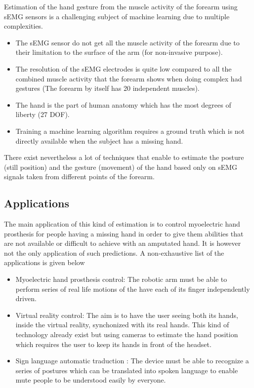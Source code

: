 \documentclass{article}
\begin{document}
Estimation of the hand gesture from the muscle activity of the forearm using sEMG sensors is a challenging subject of machine learning due to multiple complexities.
\begin{itemize}
    \item The sEMG sensor do not get all the muscle activity of the forearm due to their limitation to the surface of the arm (for non-invasive purpose).
    \item The resolution of the sEMG electrodes is quite low compared to all the combined muscle activity that the forearm shows when doing complex had gestures (The forearm by itself has 20 independent muscles).
    \item The hand is the part of human anatomy which has the most degrees of liberty (27 DOF).
    \item Training a machine learning algorithm requires a ground truth which is not directly available when the subject has a missing hand.
\end{itemize}

There exist nevertheless a lot of techniques that enable to estimate the posture (still position) and the gesture (movement) of the hand based only on sEMG signals taken from different points of the forearm.


\subsection{Applications}

The main application of this kind of estimation is to control myoelectric hand prosthesis for people having a missing hand in order to give them abilities that are not available or difficult to achieve with an amputated hand. It is however not the only application of such predictions. A non-exhaustive list of the applications is given below

\begin{itemize}
    \item Myoelectric hand prosthesis control:  The robotic arm must be able to perform series of real life motions of the have each of its finger independently driven.
    \item Virtual reality control:  The aim is to have the user seeing both its hands, inside the virtual reality, synchonized with its real hands. This kind of technology already exist \cite{ref:oculus1} but using cameras to estimate the hand position which requires the user to keep its hands in front of the headset.
    \item Sign language automatic traduction \cite{ref:signLang2, ref:signLang3}: The device must be able to recognize a series of postures which can be translated into spoken language to enable mute people to be understood easily by everyone.
\end{itemize}
\end{document}
